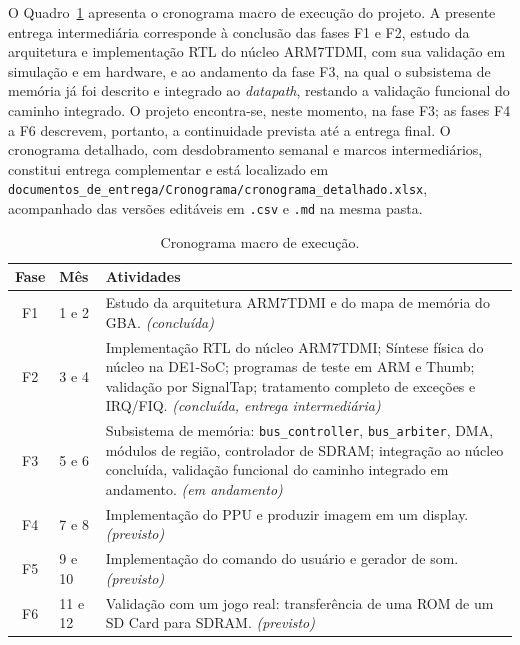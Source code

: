\documentclass[pnumromarab,times]{politex}
\begin{document}
O Quadro~\ref{tab:cronograma} apresenta o cronograma macro de execução
do projeto. A presente entrega intermediária corresponde à conclusão
das fases F1 e F2, estudo da arquitetura e implementação RTL do
núcleo ARM7TDMI, com sua validação em simulação e em hardware, e ao
andamento da fase F3, na qual o subsistema de memória já foi descrito
e integrado ao \textit{datapath}, restando a validação funcional do
caminho integrado. O projeto encontra-se, neste momento, na fase F3;
as fases F4 a F6 descrevem, portanto, a continuidade prevista até a
entrega final. O cronograma detalhado, com desdobramento semanal e
marcos intermediários, constitui entrega complementar e está
localizado em
\texttt{documentos\_de\_entrega/Cronograma/cronograma\_detalhado.xlsx},
acompanhado das versões editáveis em \texttt{.csv} e \texttt{.md} na
mesma pasta.

\begin{table}[h]
    \centering
    \caption{Cronograma macro de execução.}
    \label{tab:cronograma}
    \begin{tabular}{@{}clp{}@{}}
        \toprule
        \textbf{Fase} & \textbf{Mês} & \textbf{Atividades} \\
        \midrule
        F1 & 1 e 2 &
            Estudo da arquitetura ARM7TDMI e  do mapa de
            memória do GBA. \emph{(concluída)} \\
        F2 & 3 e 4 &
            Implementação RTL do núcleo ARM7TDMI;
            Síntese física do núcleo na DE1-SoC; programas
            de teste em ARM e Thumb; validação por
            SignalTap; tratamento completo de exceções e IRQ/FIQ.
            \emph{(concluída, entrega intermediária)} \\
        F3 & 5 e 6 &
            Subsistema de memória: \texttt{bus\_controller},
            \texttt{bus\_arbiter}, DMA, módulos de região,
            controlador de SDRAM; integração ao núcleo concluída,
            validação funcional do caminho integrado em andamento.
            \emph{(em andamento)} \\
        F4 & 7 e 8 &
            Implementação do PPU e produzir imagem em um display.
            \emph{(previsto)} \\
        F5 & 9 e 10 &
            Implementação do comando do usuário e gerador de som.
            \emph{(previsto)} \\
        F6 & 11 e 12 &
            Validação com um jogo real: transferência de uma ROM de 
            um SD Card para SDRAM. \emph{(previsto)} \\
        \bottomrule
    \end{tabular}
\end{table}
\end{document}

